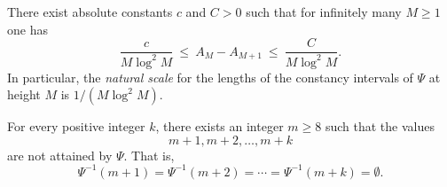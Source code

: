 \documentclass[10pt,a4paper]{amsart}
\begin{document}
\begin{proposition}\label{prop:plateau-scale}
There exist absolute constants \(c\) and \(C>0\) such that for infinitely many \(M\geq 1\) one has
\[
\frac{c}{M\log^2 M}\ \le\ A_M-A_{M+1}\ \le\ \frac{C}{M\log^2 M}.
\]
In particular, the \emph{natural scale} for the lengths of the constancy intervals of
\(\Psi\) at height \(M\) is \(1/(M\log^2 M)\).
\end{proposition}

\begin{proposition}\label{prop:psi-gaps}
For every positive integer $k$, there exists an integer $m \geq 8$ such that the values 
\[
m+1, m+2, \dots, m+k
\]
are not attained by $\Psi$. That is, 
\[
\Psi^{-1}(m+1) = \Psi^{-1}(m+2) = \cdots = \Psi^{-1}(m+k) = \emptyset.
\]
\end{proposition}
\end{document}
